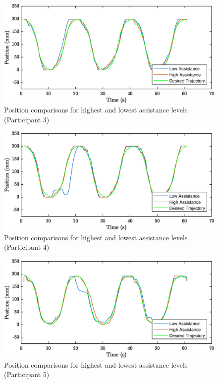 \documentclass[12pt]{report}
\begin{document}
\begin{figure}[h] 
	\centering
	\includegraphics[width=\linewidth]{pos3}
	\caption{Position comparisons for highest and lowest assistance levels (Participant 3)}
	\label{fig:pos3}
\end{figure}

\begin{figure}[h] 
	\centering
	\includegraphics[width=\linewidth]{pos4}
	\caption{Position comparisons for highest and lowest assistance levels (Participant 4)}
	\label{fig:pos4}
\end{figure}


\begin{figure}[h] 
	\centering
	\includegraphics[width=\linewidth]{pos5}
	\caption{Position comparisons for highest and lowest assistance levels (Participant 5)}
	\label{fig:pos5}
\end{figure}
\end{document}
